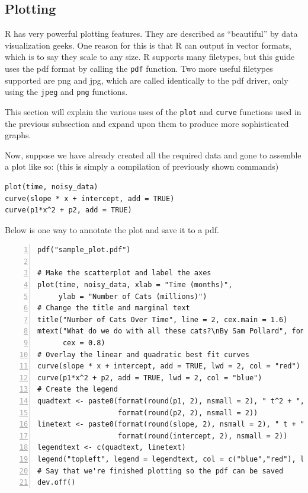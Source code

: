 \documentclass[12pt]{article}
\theoremstyle{remark}
\begin{document}



\subsection{Plotting}\label{plotting}
R has very powerful plotting features. They are described as ``beautiful'' by data visualization geeks. One reason for this is that R can output in vector formats, which is to say they scale to any size. R supports many filetypes, but this guide uses the pdf format by calling the \verb|pdf| function. Two more useful filetypes supported are png and jpg, which are called identically to the pdf driver, only using the \verb|jpeg| and \verb|png| functions.

This section will explain the various uses of the \verb|plot| and \verb|curve| functions used in the previous subsection and expand upon them to produce more sophisticated graphs.

Now, suppose we have already created all the required data and gone to assemble a plot like so: (this is simply a compilation of previously shown commands)
\begin{Verbatim}[frame=single, fontsize=\small]
plot(time, noisy_data)
curve(slope * x + intercept, add = TRUE)
curve(p1*x^2 + p2, add = TRUE)
\end{Verbatim}
Below is one way to annotate the plot and save it to a pdf.
\begin{Verbatim}[frame=single, fontsize=\small, numbers=left]
pdf("sample_plot.pdf") 

# Make the scatterplot and label the axes
plot(time, noisy_data, xlab = "Time (months)",
     ylab = "Number of Cats (millions)")
# Change the title and marginal text
title("Number of Cats Over Time", line = 2, cex.main = 1.6)
mtext("What do we do with all these cats?\nBy Sam Pollard", font = 3,
      cex = 0.8)
# Overlay the linear and quadratic best fit curves
curve(slope * x + intercept, add = TRUE, lwd = 2, col = "red")
curve(p1*x^2 + p2, add = TRUE, lwd = 2, col = "blue")
# Create the legend
quadtext <- paste0(format(round(p1, 2), nsmall = 2), " t^2 + ",
                   format(round(p2, 2), nsmall = 2))
linetext <- paste0(format(round(slope, 2), nsmall = 2), " t + ",
                   format(round(intercept, 2), nsmall = 2))
legendtext <- c(quadtext, linetext)
legend("topleft", legend = legendtext, col = c("blue","red"), lwd = c(2,2))
# Say that we're finished plotting so the pdf can be saved
dev.off()
\end{Verbatim}
\end{document}
